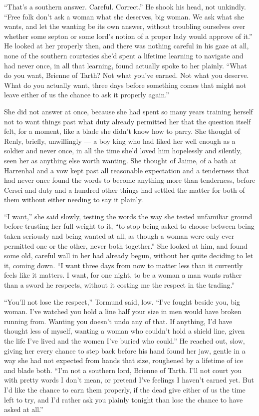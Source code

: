 “That’s a southern answer. Careful. Correct.” He shook his head, not unkindly. “Free folk don’t ask a woman what she deserves, big woman. We ask what she wants, and let the wanting be its own answer, without troubling ourselves over whether some septon or some lord’s notion of a proper lady would approve of it.” He looked at her properly then, and there was nothing careful in his gaze at all, none of the southern courtesies she’d spent a lifetime learning to navigate and had never once, in all that learning, found actually spoke to her plainly. “What do you want, Brienne of Tarth? Not what you’ve earned. Not what you deserve. What do you actually want, three days before something comes that might not leave either of us the chance to ask it properly again.”

\sceneBreak

She did not answer at once, because she had spent so many years training herself not to want things past what duty already permitted her that the question itself felt, for a moment, like a blade she didn’t know how to parry. She thought of Renly, briefly, unwillingly — a boy king who had liked her well enough as a soldier and never once, in all the time she’d loved him hopelessly and silently, seen her as anything else worth wanting. She thought of Jaime, of a bath at Harrenhal and a vow kept past all reasonable expectation and a tenderness that had never once found the words to become anything more than tenderness, before Cersei and duty and a hundred other things had settled the matter for both of them without either needing to say it plainly.

“I want,” she said slowly, testing the words the way she tested unfamiliar ground before trusting her full weight to it, “to stop being asked to choose between being taken seriously and being wanted at all, as though a woman were only ever permitted one or the other, never both together.” She looked at him, and found some old, careful wall in her had already begun, without her quite deciding to let it, coming down. “I want three days from now to matter less than it currently feels like it matters. I want, for one night, to be a woman a man wants rather than a sword he respects, without it costing me the respect in the trading.”

“You’ll not lose the respect,” Tormund said, low. “I’ve fought beside you, big woman. I’ve watched you hold a line half your size in men would have broken running from. Wanting you doesn’t undo any of that. If anything, I’d have thought less of myself, wanting a woman who couldn’t hold a shield line, given the life I’ve lived and the women I’ve buried who could.” He reached out, slow, giving her every chance to step back before his hand found her jaw, gentle in a way she had not expected from hands that size, roughened by a lifetime of ice and blade both. “I’m not a southern lord, Brienne of Tarth. I’ll not court you with pretty words I don’t mean, or pretend I’ve feelings I haven’t earned yet. But I’d like the chance to earn them properly, if the dead give either of us the time left to try, and I’d rather ask you plainly tonight than lose the chance to have asked at all.”

